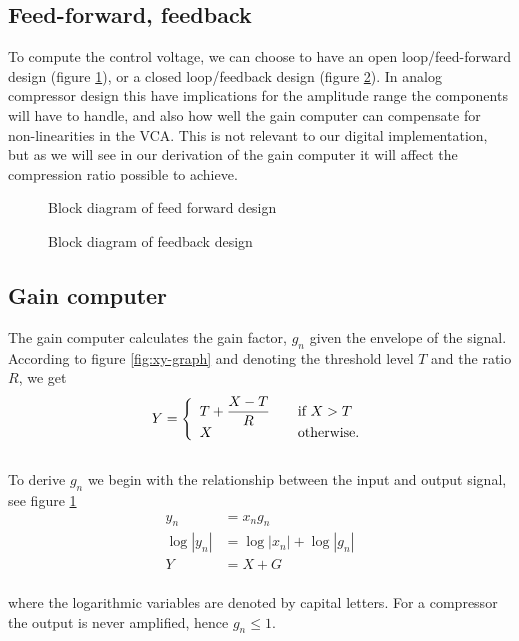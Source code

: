 \documentclass[]{article}
\begin{document}
\subsection{Feed-forward, feedback}
To compute the control voltage, we can choose to have an open loop/feed-forward design (figure \ref{fig:feedforward-blockdiagram}), or a closed loop/feedback design (figure \ref{fig:feedback-blockdiagram}). In analog compressor design this have implications for the amplitude range the components will have to handle, and also how well the gain computer can compensate for non-linearities in the VCA. This is not relevant to our digital implementation, but as we will see in our derivation of the gain computer it will affect the compression ratio possible to achieve.

\begin{figure}[ht]
\centering

\caption{Block diagram of feed forward design}
\label{fig:feedforward-blockdiagram}
\end{figure}

\begin{figure}[ht]
\centering

\caption{Block diagram of feedback design} 
\label{fig:feedback-blockdiagram}
\end{figure}

\subsection{Gain computer}
The gain computer calculates the gain factor, $g_n$ given the envelope of the signal. According to figure \ref{fig:xy-graph} and denoting the threshold level $T$ and the ratio $R$, we get
\begin{equation} \label{eq:gaincomp}
Y = \left\{ 
  \begin{array}{l l}
    T+ \dfrac{X-T}{R} & \quad \text{if $X > T$}\\
    X & \quad \text{otherwise.}
  \end{array} \right.
\end{equation}
\\ To derive $g_n$ we begin with the relationship between the input and output signal, see figure \ref{fig:feedforward-blockdiagram}
\begin{align}
y_n &= x_ng_n   \\
\log|y_n| & = \log|x_n| + \log|g_n|   \\
Y &= X + G \label{eq:cv}
\end{align}
\\ where the logarithmic variables are denoted by capital letters. For a compressor the output is never amplified, hence $g_n \leq 1$.
\end{document}
